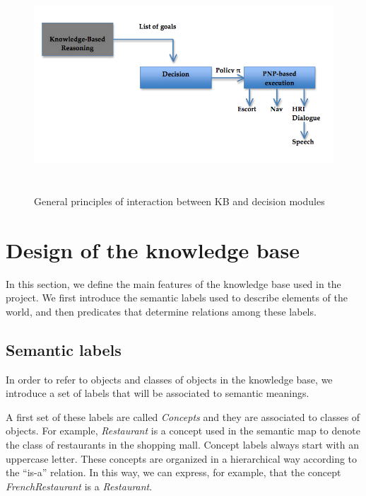 \documentclass{article}
\begin{document}
\begin{figure}[htbp]
\begin{center}
\includegraphics[height=8cm]{WP1Principles}
\caption{General principles of interaction between KB  and decision modules}
\label{WP1principle}
\end{center}
\end{figure}


\section{Design of the knowledge base}

In this section, we define the main features of the knowledge base used in the project. We first introduce the semantic labels used to describe elements of the world, and then predicates that determine relations among these labels.

\subsection{Semantic labels}

In order to refer to objects and classes of objects in the knowledge base, we introduce a set of labels that will be associated to semantic meanings. 

A first set of these labels are called \emph{Concepts} and they are associated to classes of objects. For example, \emph{Restaurant} is a concept used in the semantic map to denote the class of restaurants in the shopping mall. Concept labels always start with an uppercase letter.
These concepts are organized in a hierarchical way according to the ``is-a'' relation.
In this way, we can express, for example, that the concept \emph{FrenchRestaurant} is a \emph{Restaurant}. 
\end{document}
